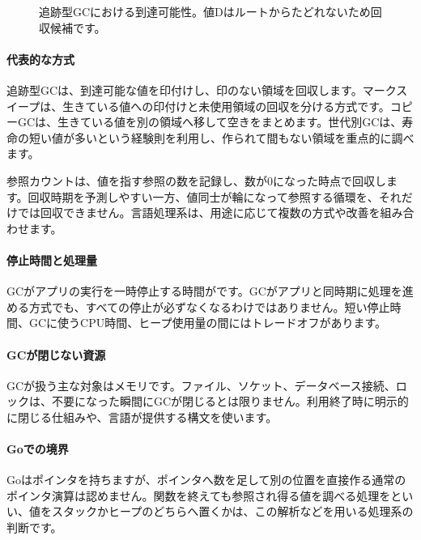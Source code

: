 \begin{figure}[htbp]
  \centering
  \caption{追跡型GCにおける到達可能性。値Dはルートからたどれないため回収候補です。}
  \label{fig:gc-reachability}
\end{figure}

\paragraph{代表的な方式}
追跡型GCは、到達可能な値を印付けし、印のない領域を回収します。マークスイープは、生きている値への印付けと未使用領域の回収を分ける方式です。コピーGCは、生きている値を別の領域へ移して空きをまとめます。世代別GCは、寿命の短い値が多いという経験則を利用し、作られて間もない領域を重点的に調べます。

参照カウントは、値を指す参照の数を記録し、数が0になった時点で回収します。回収時期を予測しやすい一方、値同士が輪になって参照する循環を、それだけでは回収できません。言語処理系は、用途に応じて複数の方式や改善を組み合わせます。

\paragraph{停止時間と処理量}
GCがアプリの実行を一時停止する時間がです。GCがアプリと同時期に処理を進める方式でも、すべての停止が必ずなくなるわけではありません。短い停止時間、GCに使うCPU時間、ヒープ使用量の間にはトレードオフがあります。

\paragraph{GCが閉じない資源}
GCが扱う主な対象はメモリです。ファイル、ソケット、データベース接続、ロックは、不要になった瞬間にGCが閉じるとは限りません。利用終了時に明示的に閉じる仕組みや、言語が提供する構文を使います。


\vspace{4mm}
\paragraph{Goでの境界}
    Goはポインタを持ちますが、ポインタへ数を足して別の位置を直接作る通常のポインタ演算は認めません。関数を終えても参照され得る値を調べる処理をといい、値をスタックかヒープのどちらへ置くかは、この解析などを用いる処理系の判断です。

